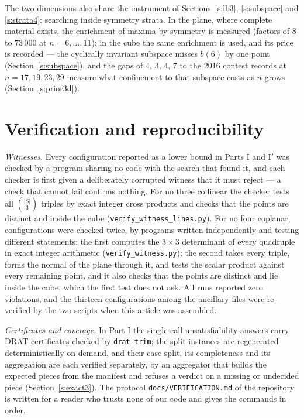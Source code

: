 \documentclass[11pt,a4paper]{article}
\begin{document}
The two dimensions also share the instrument of Sections~\ref{s:lb3}, \ref{s:subspace} and \ref{s:strata4}: searching inside
symmetry strata.  In the plane, where complete material exists, the enrichment of maxima by symmetry is measured (factors of
$8$ to $73\,000$ at $n=6,\dots,11$); in the cube the same enrichment is used, and its price is recorded --- the cyclically
invariant subspace misses $b(6)$ by one point (Section~\ref{s:subspace}), and the gaps of $4$, $3$, $4$, $7$ to the 2016
contest records at $n=17,19,23,29$ measure what confinement to that subspace costs as $n$ grows (Section~\ref{s:prior3d}).

\section{Verification and reproducibility}\label{s:repro}
\emph{Witnesses.}  Every configuration reported as a lower bound in Parts I and I$'$ was checked by a program sharing no code
with the search that found it, and each checker is first given a deliberately corrupted witness that it must reject --- a check
that cannot fail confirms nothing.  For no three collinear the checker tests all $\binom{|S|}{3}$ triples by exact integer cross
products and checks that the points are distinct and inside the cube (\texttt{verify\_witness\_lines.py}).  For no four coplanar,
configurations were checked twice, by programs written independently and testing different statements: the first computes the
$3\times3$ determinant of every quadruple in exact integer arithmetic (\texttt{verify\_witness.py}); the second takes every
triple, forms the normal of the plane through it, and tests the scalar product against every remaining point, and it also checks
that the points are distinct and lie inside the cube, which the first test does not ask.  All runs reported zero violations, and
the thirteen configurations among the ancillary files were re-verified by the two scripts when this article was assembled.

\emph{Certificates and coverage.}  In Part I the single-call unsatisfiability answers carry DRAT certificates checked by
\texttt{drat-trim}; the split instances are regenerated deterministically on demand, and their case split, its completeness and
its aggregation are each verified separately, by an aggregator that builds the expected pieces from the manifest and refuses a
verdict on a missing or undecided piece (Section~\ref{s:exact3}).  The protocol \texttt{docs/VERIFICATION.md} of the repository
is written for a reader who trusts none of our code and gives the commands in order.
\end{document}
